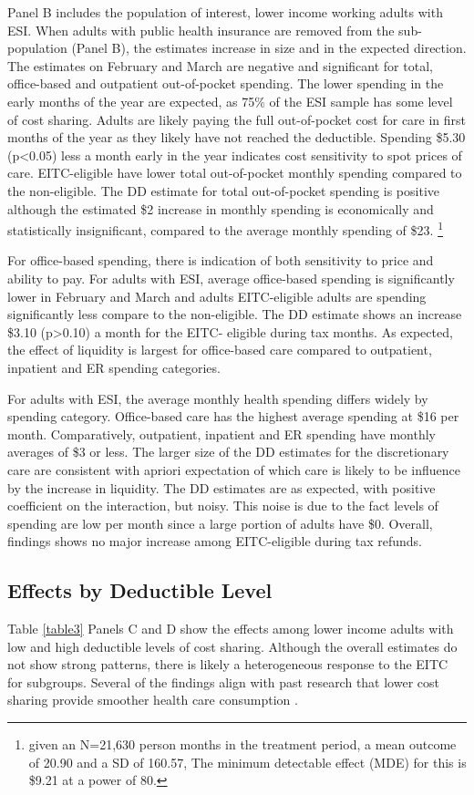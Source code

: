 \documentclass[smallcondensed,referee]{svjour3}
\begin{document}
Panel B includes the population of interest, lower income working adults with ESI.
When adults with public health insurance are removed from the sub-population (Panel B), the estimates increase in size and in the expected direction.  The estimates on February and March are negative and significant for total, office-based and outpatient out-of-pocket spending.  The  lower spending in the early months of the year are expected, as 75\% of the ESI sample has some level of cost sharing. Adults are likely paying the full out-of-pocket cost for care in first months of the year as they likely have not reached the deductible. Spending \$5.30 (p<0.05) less a month early in the year indicates cost sensitivity to spot prices of care.  EITC-eligible have lower total out-of-pocket monthly spending compared to the non-eligible. The DD estimate for total out-of-pocket spending is positive although the estimated \$2 increase in monthly spending is economically and statistically insignificant, compared to the average monthly spending of \$23.   \footnote{given an N=21,630 person months in the treatment period, a mean outcome of 20.90 and a SD of 160.57, The minimum detectable effect (MDE) for this is \$9.21 at a power of 80.}

For office-based spending, there is indication of both sensitivity to price and ability to pay. For adults with ESI, average office-based spending is significantly lower in February and March and adults EITC-eligible adults are spending significantly less compare to the non-eligible. The DD estimate shows an increase \$3.10 (p>0.10) a month for the EITC- eligible during tax months. As expected, the effect of liquidity is largest for office-based care compared to outpatient, inpatient and ER spending categories. 

 For adults with ESI, the average monthly health spending differs widely by spending category. Office-based care has the highest average spending at \$16 per month. Comparatively, outpatient, inpatient and ER spending have monthly averages of \$3 or less. The larger size of the DD estimates for the discretionary care are consistent with apriori expectation of which care is likely to be influence by the increase in liquidity. The DD estimates are as expected, with positive coefficient on the interaction, but noisy. This noise is due to the fact levels of spending are low per month since a large portion of adults have \$0. Overall, findings shows no major increase among EITC-eligible during tax refunds.  


\subsection{Effects by Deductible Level}
Table \ref{table3} Panels C and D show the effects among lower income adults with low and high deductible levels of cost sharing. Although the overall estimates do not show strong patterns, there is likely a heterogeneous response to the EITC for subgroups.  Several of the findings align with past research that lower cost sharing provide smoother health care consumption \citep{ericson_liquidity_2018}.
\end{document}
